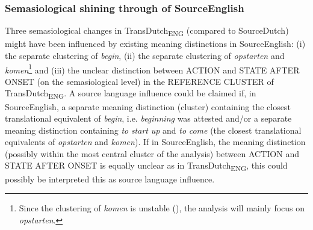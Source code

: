 \subsubsection{Semasiological shining through of SourceEnglish}
\label{sec:4.6.1.1}  
Three semasiological changes in TransDutch\textsubscript{ENG} (compared to SourceDutch) might have been influenced by existing meaning distinctions in SourceEnglish: (i) the separate clustering of \textit{begin}, (ii) the separate clustering of \textit{opstarten} and \textit{komen}\footnote{Since the clustering of \textit{komen} is unstable (), the analysis will mainly focus on \textit{opstarten}.} and (iii) the unclear distinction between ACTION and STATE AFTER ONSET (on the semasiological level) in the REFERENCE CLUSTER of TransDutch\textsubscript{ENG}. A source language influence could be claimed if, in SourceEnglish, a separate meaning distinction (cluster) containing the closest translational equivalent of \textit{begin}, i.e. \textit{beginning} was attested and\slash or a separate meaning distinction containing \textit{to} \textit{start} \textit{up} and \textit{to} \textit{come} (the closest translational equivalents of \textit{opstarten} and \textit{komen}). If in SourceEnglish, the meaning distinction (possibly within the most central cluster of the analysis) between ACTION and STATE AFTER ONSET is equally unclear as in TransDutch\textsubscript{ENG}, this could possibly be interpreted this as source language influence.


